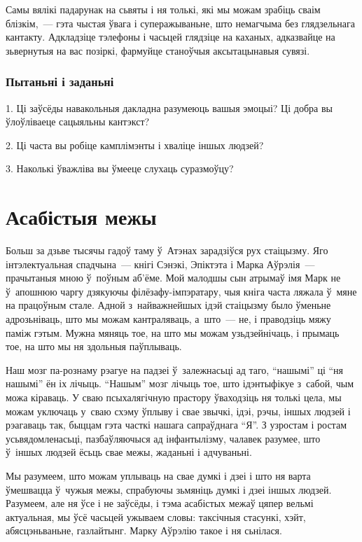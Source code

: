 Самы вялікі падарунак на сьвяты і ня толькі, які мы можам зрабіць сваім блізкім,~--- гэта чыстая ўвага і суперажываньне, што немагчыма без глядзельнага кантакту. Адкладзіце тэлефоны і часьцей глядзіце на каханых, адказвайце на зьвернутыя на вас позіркі, фармуйце станоўчыя аксытацынавыя сувязі.

\subsubsection{Пытаньні і заданьні}

1. Ці заўсёды навакольныя дакладна разумеюць вашыя эмоцыі? Ці добра вы ўлоўліваеце сацыяльны кантэкст?

2. Ці часта вы робіце камплімэнты і хваліце іншых людзей?

3. Наколькі ўважліва вы ўмееце слухаць суразмоўцу?


\section{Асабістыя межы}

Больш за дзьве тысячы гадоў таму ў~Атэнах зарадзіўся рух стаіцызму. Яго інтэлектуальная спадчына~--- кнігі Сэнэкі, Эпіктэта і Марка Аўрэлія~--- прачытаныя мною ў~поўным аб'ёме. Мой малодшы сын атрымаў імя Марк не ў~апошнюю чаргу дзякуючы філёзафу-імпэратару, чыя кніга часта ляжала ў~мяне на працоўным стале. Адной з~найважнейшых ідэй стаіцызму было ўменьне адрозьніваць, што мы можам кантраляваць, а~што~--- не, і праводзіць мяжу паміж гэтым. Мужна мяняць тое, на што мы можам узьдзейнічаць, і прымаць тое, на што мы ня здольныя паўплываць.

Наш мозг па-рознаму рэагуе на падзеі ў~залежнасьці ад таго, ``нашымі'' ці ``ня нашымі'' ён іх лічыць. ``Нашым'' мозг лічыць тое, што ідэнтыфікуе з~сабой, чым можа кіраваць. У сваю псыхалягічную прастору ўваходзіць ня толькі цела, мы можам уключаць у~сваю схэму ўплыву і свае звычкі, ідэі, рэчы, іншых людзей і рэагаваць так, быццам гэта часткі нашага сапраўднага ``Я''. З узростам і ростам усьвядомленасьці, пазбаўляючыся ад інфантылізму, чалавек разумее, што ў~іншых людзей ёсьць свае межы, жаданьні і адчуваньні. 

Мы разумеем, што можам уплываць на свае думкі і дзеі і што ня варта ўмешвацца ў~чужыя межы, спрабуючы зьмяніць думкі і дзеі іншых людзей. Разумеем, але ня ўсе і не заўсёды, і тэма асабістых межаў цяпер вельмі актуальная, мы ўсё часьцей ужываем словы: таксічныя стасункі, хэйт, абясцэньваньне, газлайтынг. Марку Аўрэлію такое і ня сьнілася.

